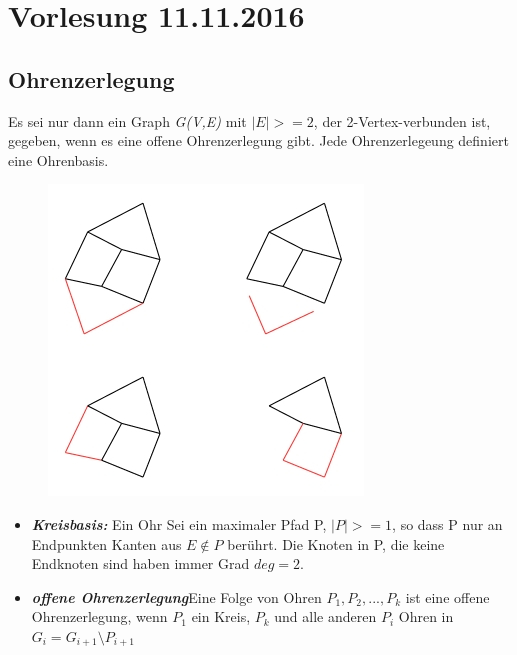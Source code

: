 \section{Vorlesung 11.11.2016}
\subsection{Ohrenzerlegung}

Es sei nur dann ein Graph \textit{G(V,E)} mit $|E|>=2$, der 2-Vertex-verbunden ist, gegeben, wenn es eine offene Ohrenzerlegung gibt. Jede Ohrenzerlegeung definiert eine Ohrenbasis.

\begin{figure}[htp]
\centering
\includegraphics[scale=1.00]{lectures/161111/pix/pic1.jpg}
\end{figure}

\begin{itemize}
	\item \textbf{\textit{Kreisbasis:}} \newline Ein Ohr Sei ein maximaler Pfad P, $|P| >= 1$, so dass P nur an Endpunkten Kanten aus $E\notin P$ berührt. Die Knoten in P, die keine Endknoten sind haben immer Grad $deg = 2$.
	\item \textbf{\textit{offene Ohrenzerlegung}}\newline Eine Folge von Ohren $P_1, P_2, ..., P_k$ ist eine offene Ohrenzerlegung, wenn $P_1$ ein Kreis, $P_k$ und alle anderen $P_i$ Ohren in $G_i = G_{i+1} \setminus P_{i+1}$
\end{itemize}

\newpage
